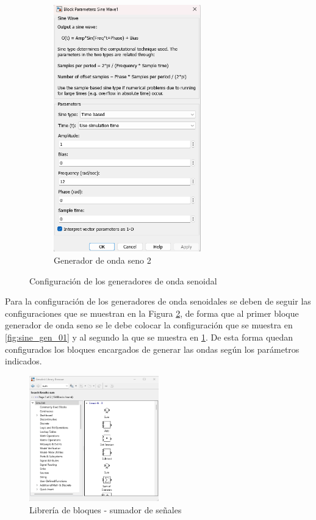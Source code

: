 \begin{figure}[htbp]
\begin{subfigure}[b]{0.45\textwidth}
        \includegraphics[width=0.7\textwidth]{fig/especifico_2/CASO_ESTUDIO_FILTRO/sinewave_2.png}
        \caption{Generador de onda seno 2}
        \label{fig:sine_gen_02}
    \end{subfigure}
    \caption{Configuración de los generadores de onda senoidal}
    \label{fig:sine_wave_generators_config}
\end{figure}

Para la configuración de los generadores de onda senoidales se deben de seguir las configuraciones que se muestran en la Figura \ref{fig:sine_wave_generators_config}, de forma que al primer bloque generador de onda seno se le debe colocar la configuración que se muestra en \ref{fig:sine_gen_01} y al segundo la que se muestra en \ref{fig:sine_gen_02}. De esta forma quedan configurados los bloques encargados de generar las ondas según los parámetros indicados.


\begin{figure}[h!]
    \centering
    \includegraphics[width=0.5\textwidth]{fig/especifico_2/CASO_ESTUDIO_FILTRO/sum_0.png}
    \caption{Librería de bloques - sumador de señales}
    \label{fig:lib_bloq_sum}
\end{figure}


